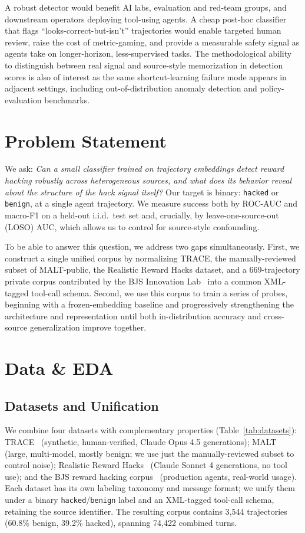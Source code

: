 \documentclass{article}
\begin{document}
A robust detector would benefit AI labs, evaluation and red-team groups, and downstream operators deploying tool-using agents. A cheap post-hoc classifier that flags ``looks-correct-but-isn't'' trajectories would enable targeted human review, raise the cost of metric-gaming, and provide a measurable safety signal as agents take on longer-horizon, less-supervised tasks. The methodological ability to distinguish between real signal and source-style memorization in detection scores is also of interest as the same shortcut-learning failure mode appears in adjacent settings, including out-of-distribution anomaly detection and policy-evaluation benchmarks.


\section{Problem Statement}

We ask: \emph{Can a small classifier trained on trajectory embeddings detect reward hacking robustly across heterogeneous sources, and what does its behavior reveal about the structure of the hack signal itself?} Our target is binary: \texttt{hacked} or \texttt{benign}, at a single agent trajectory. We measure success both by ROC-AUC and macro-F1 on a held-out i.i.d.\ test set and, crucially, by leave-one-source-out (LOSO) AUC, which allows us to control for source-style confounding.

To be able to answer this question, we address two gaps simultaneously. First, we construct a single unified corpus by normalizing TRACE, the manually-reviewed subset of MALT-public, the Realistic Reward Hacks dataset, and a 669-trajectory private corpus contributed by the BJS Innovation Lab~\cite{bjs-corpus} into a common XML-tagged tool-call schema. Second, we use this corpus to train a series of probes, beginning with a frozen-embedding baseline and progressively strengthening the architecture and representation until both in-distribution accuracy and cross-source generalization improve together.


\section{Data \& EDA}

\subsection{Datasets and Unification}

We combine four datasets with complementary properties (Table~\ref{tab:datasets}): TRACE~\cite{trace2026} (synthetic, human-verified, Claude Opus 4.5 generations); MALT~\cite{malt} (large, multi-model, mostly benign; we use just the manually-reviewed subset to control noise); Realistic Reward Hacks~\cite{jozdien-rrh} (Claude Sonnet 4 generations, no tool use); and the BJS reward hacking corpus~\cite{bjs-corpus} (production agents, real-world usage). Each dataset has its own labeling taxonomy and message format; we unify them under a binary \texttt{hacked}/\texttt{benign} label and an XML-tagged tool-call schema, retaining the source identifier. The resulting corpus contains 3{,}544 trajectories (60.8\% benign, 39.2\% hacked), spanning 74{,}422 combined turns.
\end{document}
